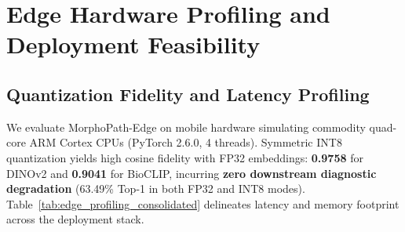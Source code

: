 \section{Edge Hardware Profiling and Deployment Feasibility}
\label{sec:edge_profiling}

\subsection{Quantization Fidelity and Latency Profiling}
\label{subsec:latency_profiling}
We evaluate MorphoPath-Edge on mobile hardware simulating commodity quad-core ARM Cortex CPUs (PyTorch 2.6.0, 4 threads). Symmetric INT8 quantization yields high cosine fidelity with FP32 embeddings: \textbf{0.9758} for DINOv2 and \textbf{0.9041} for BioCLIP, incurring \textbf{zero downstream diagnostic degradation} (63.49\% Top-1 in both FP32 and INT8 modes). Table~\ref{tab:edge_profiling_consolidated} delineates latency and memory footprint across the deployment stack.

\begin{table}[htbp]
\footnotesize
\centering
\renewcommand{\arraystretch}{0.88}
\setlength{\tabcolsep}{3pt}
\caption{Consolidated Edge Deployment Profiling on 4-Thread CPU.}
\label{tab:edge_profiling_consolidated}
\end{table}

